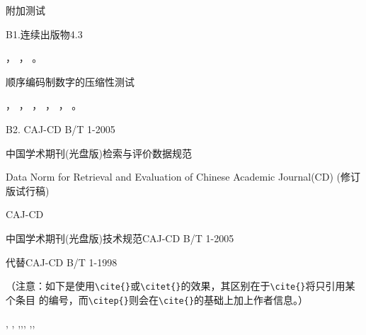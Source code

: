 附加测试

B1.连续出版物4.3

，
，
。

顺序编码制数字的压缩性测试

，
，
，
，
，
。

B2. CAJ-CD B/T 1-2005

中国学术期刊(光盘版)检索与评价数据规范

Data Norm for Retrieval and Evaluation of Chinese Academic Journal(CD) (修订版试行稿)

CAJ-CD

中国学术期刊(光盘版)技术规范CAJ-CD B/T 1-2005

代替CAJ-CD B/T 1-1998

（注意：如下是使用\verb|\cite{}|或\verb|\citet{}|的效果，其区别在于\verb|\cite{}|将只引用某个条目
的编号，而\verb|\citep{}|则会在\verb|\cite{}|的基础上加上作者信息。）

\citet[12]{zhuyixuan1985},
\cite{yejianying1946},
\cite{gwywgzjj1958},\cite{shenkuogwywgzjj1070},\cite{jiyun1800},
\citet{liujiang2004},\citet{wanjingkun1996},\citet{dai1983}